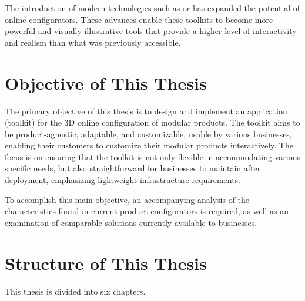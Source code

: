 The introduction of modern technologies such as  or  has expanded the potential of online configurators. These advances enable these toolkits to become more powerful and visually illustrative tools that provide a higher level of interactivity and realism than what was previously accessible.~\cite{Cozzi2015}

\section*{Objective of This Thesis}

The primary objective of this thesis is to design and implement an application (toolkit) for the 3D online configuration of modular products. The toolkit aims to be product-agnostic, adaptable, and customizable, usable by various businesses, enabling their customers to customize their modular products interactively. The focus is on ensuring that the toolkit is not only flexible in accommodating various specific needs, but also straightforward for businesses to maintain after deployment, emphasizing lightweight infrastructure requirements. 

To accomplish this main objective, an accompanying analysis of the characteristics found in current product configurators is required, as well as an examination of comparable solutions currently available to businesses.

\section*{Structure of This Thesis}

This thesis is divided into six chapters.

